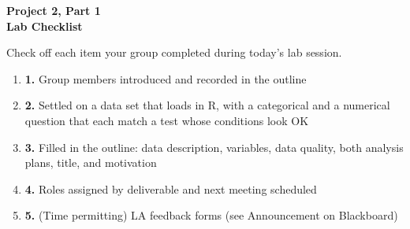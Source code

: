\documentclass[12pt]{article}
\begin{document}
\begin{center}
\textbf{\Large Project 2, Part 1 \\ Lab Checklist}
\end{center}

\nameBUID


\noindent Check off each item your group completed during today's lab session.
\begin{enumerate}
    \item[$\square$] \textbf{1.} Group members introduced and recorded in the outline
    \item[$\square$] \textbf{2.} Settled on a data set that loads in R, with a categorical and a numerical question that each match a test whose conditions look OK
    \item[$\square$] \textbf{3.} Filled in the outline: data description, variables, data quality, both analysis plans, title, and motivation
    \item[$\square$] \textbf{4.} Roles assigned by deliverable and next meeting scheduled
    \item[$\square$] \textbf{5.} (Time permitting) LA feedback forms (see Announcement on Blackboard)
\end{enumerate}
\end{document}
